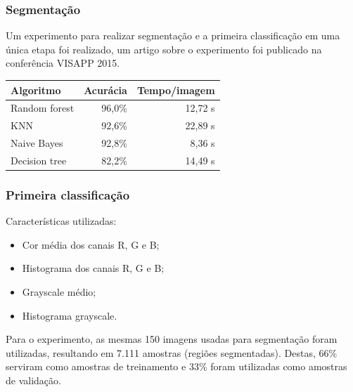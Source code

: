 \documentclass[t]{beamer}
\begin{document}
\begin{frame}
	\frametitle{Segmentação}
	
	Um experimento para realizar segmentação e a primeira classificação em uma única etapa foi realizado, um artigo sobre o experimento foi publicado  na conferência VISAPP 2015. 

	\small{
	\begin{table}
	\centering
	\begin{tabulary}{\linewidth}{|L|R|R|}
		\hline
		\textbf{Algoritmo} & \textbf{Acurácia} & \textbf{Tempo/imagem} \\ \hline
		Random forest  & 96,0\% & 12,72 s \\ \hline
		KNN            & 92,6\% & 22,89 s \\ \hline
		Naive Bayes    & 92,8\% & 8,36 s \\ \hline
		Decision tree  & 82,2\% & 14,49 s \\ \hline
	\end{tabulary}
	\end{table}
	}

\end{frame}

\begin{frame}
	\frametitle{Primeira classificação}

	Características utilizadas:
	\begin{itemize}
		\item Cor média dos canais R, G e B;
		\item Histograma dos canais R, G e B;
		\item Grayscale médio;
		\item Histograma grayscale.
	\end{itemize}

	\vspace{0.5cm}

	Para o experimento, as mesmas 150 imagens usadas para segmentação foram utilizadas, resultando em 7.111 amostras (regiões segmentadas). Destas, 66\% serviram como amostras de treinamento e 33\% foram utilizadas como amostras de validação.
	
\end{frame}
\end{document}
